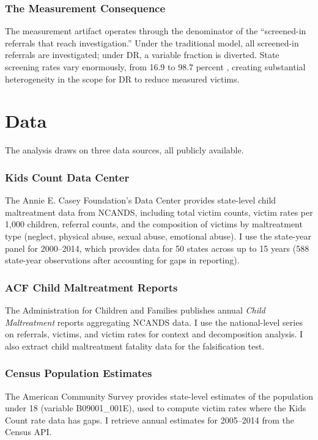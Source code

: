 \documentclass[12pt]{article}
\begin{document}
\subsubsection*{The Measurement Consequence} The measurement artifact operates through the denominator of the ``screened-in referrals that reach investigation.'' Under the traditional model, all screened-in referrals are investigated; under DR, a variable fraction is diverted. State screening rates vary enormously, from 16.9 to 98.7 percent \citep{CWLG2014}, creating substantial heterogeneity in the scope for DR to reduce measured victims.

\section{Data}

The analysis draws on three data sources, all publicly available.

\subsubsection*{Kids Count Data Center} The Annie E. Casey Foundation's Data Center provides state-level child maltreatment data from NCANDS, including total victim counts, victim rates per 1,000 children, referral counts, and the composition of victims by maltreatment type (neglect, physical abuse, sexual abuse, emotional abuse). I use the state-year panel for 2000--2014, which provides data for 50 states across up to 15 years (588 state-year observations after accounting for gaps in reporting).

\subsubsection*{ACF Child Maltreatment Reports} The Administration for Children and Families publishes annual \textit{Child Maltreatment} reports aggregating NCANDS data. I use the national-level series on referrals, victims, and victim rates for context and decomposition analysis. I also extract child maltreatment fatality data for the falsification test.

\subsubsection*{Census Population Estimates} The American Community Survey provides state-level estimates of the population under 18 (variable B09001\_001E), used to compute victim rates where the Kids Count rate data has gaps. I retrieve annual estimates for 2005--2014 from the Census API.
\end{document}
